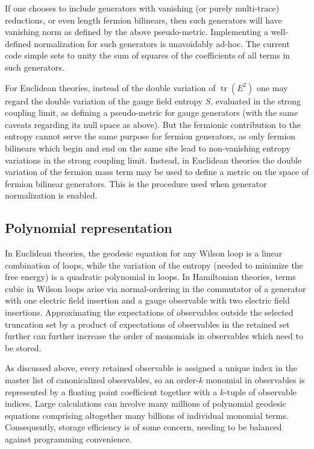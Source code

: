 \documentclass [12pt]{article}
\newcommand{\tr}{\mathop{\mathrm{tr}}}
\begin{document}
If one chooses to include generators with vanishing
(or purely multi-trace) reductions, or even length fermion bilinears,
then such generators will have
vanishing norm as defined by the above pseudo-metric.
Implementing a well-defined normalization for such generators
is unavoidably ad-hoc.
The current code simple sets to unity the sum of squares of
the coefficients of all terms in such generators.

For Euclidean theories, instead of the double variation of $\tr(E^2)$
one may regard the double variation of the gauge field entropy $S$,
evaluated in the strong coupling limit, as defining a pseudo-metric
for gauge generators (with the same caveats regarding its null space
as above).
But the fermionic contribution to the entropy cannot serve the same
purpose for fermion generators, as only 
fermion bilinears which
begin and end on the same site lead to non-vanishing entropy
variations in the strong coupling limit.
Instead, in Euclidean theories the double variation of the fermion mass term
may be used to define a metric on the space of fermion bilinear generators.
This is the procedure used when generator normalization is enabled.

\subsection {Polynomial representation}

In Euclidean theories, the geodesic equation for any
Wilson loop is a linear combination of loops,
while the variation of the entropy (needed to minimize
the free energy) is a quadratic polynomial in loops.
In Hamiltonian theories, terms cubic in Wilson loops
arise via normal-ordering in the commutator of a
generator with one electric field insertion and
a gauge observable with two electric field insertions.
Approximating the expectations of observables outside
the selected truncation set by a product of expectations
of observables in the retained set further can further
increase the order of monomials in observables which
need to be stored.

As discussed above, every retained observable is
assigned a unique index in the master list of
canonicalized observables, so an order-$k$ monomial in
observables is represented by a floating point coefficient
together with a $k$-tuple of observable indices.
Large calculations can involve many millions of polynomial geodesic
equations comprising altogether many billions of individual monomial terms.
Consequently, storage efficiency is of some concern,
needing to be balanced against programming convenience.
\end{document}
